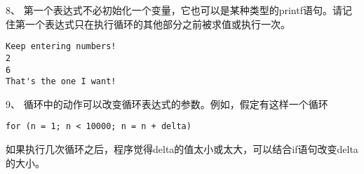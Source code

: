 \begin{frame}[fragile]
8、 第一个表达式不必初始化一个变量，它也可以是某种类型的printf语句。请记住第一个表达式只在执行循环的其他部分之前被求值或执行一次。
\end{frame}

\begin{frame}[fragile]
  
\end{frame}

\begin{frame}[fragile]
\begin{lstlisting}[backgroundcolor=\color{red!10}]
Keep entering numbers!
2
6
That's the one I want!
\end{lstlisting}
\end{frame}

\begin{frame}[fragile]
9、 循环中的动作可以改变循环表达式的参数。例如，假定有这样一个循环
\begin{lstlisting}
for (n = 1; n < 10000; n = n + delta)
\end{lstlisting}
如果执行几次循环之后，程序觉得delta的值太小或太大，可以结合if语句改变delta的大小。
\end{frame}


